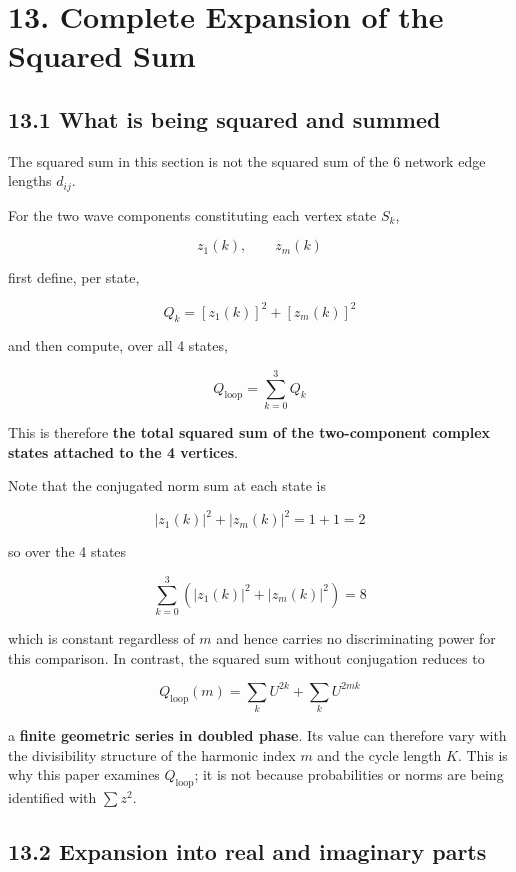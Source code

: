 \documentclass[
  a4paper,
]{article}
\begin{document}
\section{13. Complete Expansion of the Squared
Sum}\label{complete-expansion-of-the-squared-sum}

\subsection{13.1 What is being squared and
summed}\label{what-is-being-squared-and-summed}

The squared sum in this section is not the squared sum of the 6 network
edge lengths \(d_{ij}\).

For the two wave components constituting each vertex state \(S_k\),

\[
z_1(k),
\qquad
z_m(k)
\]

first define, per state,

\[
Q_k
=
[z_1(k)]^2+[z_m(k)]^2
\]

and then compute, over all 4 states,

\[
Q_{\mathrm{loop}}
=
\sum_{k=0}^{3}Q_k
\]

This is therefore \textbf{the total squared sum of the two-component
complex states attached to the 4 vertices}.

Note that the conjugated norm sum at each state is

\[
|z_1(k)|^2+|z_m(k)|^2=1+1=2
\]

so over the 4 states

\[
\sum_{k=0}^{3}\left(|z_1(k)|^2+|z_m(k)|^2\right)=8
\]

which is constant regardless of \(m\) and hence carries no
discriminating power for this comparison. In contrast, the squared sum
without conjugation reduces to

\[
Q_{\mathrm{loop}}(m)
=
\sum_k U^{2k}+\sum_k U^{2mk}
\]

a \textbf{finite geometric series in doubled phase}. Its value can
therefore vary with the divisibility structure of the harmonic index
\(m\) and the cycle length \(K\). This is why this paper examines
\(Q_{\mathrm{loop}}\); it is not because probabilities or norms are
being identified with \(\sum z^2\).

\subsection{13.2 Expansion into real and imaginary
parts}\label{expansion-into-real-and-imaginary-parts}
\end{document}

